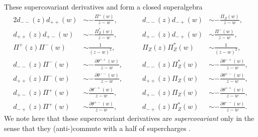 \documentclass[a4paper,seceq,preprint]{ptptex}
\begin{document}
These supercovariant derivatives and 
\coordHE{} form 
a closed superalgebra
\begin{alignat}{2}
 d_{--}(z)d_{++}(w)&\sim
-\frac{\Pi^+(w)}{z-w},&\qquad
 d_{--}(z)d_{-+}(w)&\sim 
-\frac{\Pi_Z(w)}{z-w},\nonumber\\
d_{++}(z)d_{+-}(w)&\sim
-\frac{\Pi^*_Z(w)}{z-w},&\qquad
d_{+-}(z)d_{-+}(w)&\sim
\frac{\Pi^-(w)}{z-w},\nonumber\\
\Pi^+(z)\Pi^-(w)&\sim
\frac{1}{(z-w)^2},&\qquad
\Pi_Z(z)\Pi^*_Z(w)&\sim
\frac{1}{(z-w)^2},\nonumber\\
d_{--}(z)\Pi^-(w)&\sim
-\frac{\partial\theta^{++}(w)}{z-w},&\qquad
d_{--}(z)\Pi^*_Z(w)&\sim
-\frac{\partial\theta^{-+}(w)}{z-w},\nonumber\\
d_{++}(z)\Pi^-(w)&\sim
-\frac{\partial\theta^{--}(w)}{z-w},&\qquad
d_{++}(z)\Pi_Z(w)&\sim
-\frac{\partial\theta^{+-}(w)}{z-w},\nonumber\\
d_{+-}(z)\Pi^+(w)&\sim
\frac{\partial\theta^{-+}(w)}{z-w},&\qquad
d_{+-}(z)\Pi_Z(w)&\sim
-\frac{\partial\theta^{++}(w)}{z-w},\nonumber\\
d_{-+}(z)\Pi^+(w)&\sim
\frac{\partial\theta^{+-}(w)}{z-w},&\qquad
d_{-+}(z)\Pi^*_Z(w)&\sim
-\frac{\partial\theta^{--}(w)}{z-w}.
\end{alignat}
We note here that these supercovariant derivatives 
are {\it supercovariant} only in the sense that they 
(anti-)commute with a half of supercharges \coordHE{}.
\end{document}
